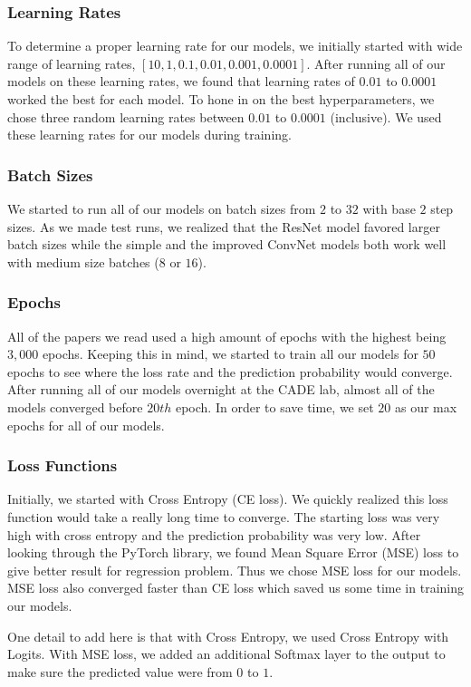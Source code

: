\documentclass[11pt]{ieeeconf}
\begin{document}
\subsubsection{Learning Rates}
To determine a proper learning rate for our models, we initially started with wide range of learning rates, $[10, 1, 0.1, 0.01, 0.001, 0.0001]$. After running all of our models on these learning rates, we found that learning rates of $0.01$ to $0.0001$ worked the best for each model. To hone in on the best hyperparameters, we chose three random learning rates between $0.01$ to $0.0001$ (inclusive). We used these learning rates for our models during training. 

\subsubsection{Batch Sizes}
We started to run all of our models on batch sizes from $2$ to $32$ with base $2$ step sizes. As we made test runs, we realized that the ResNet model favored larger batch sizes while the simple and the improved ConvNet models both work well with medium size batches ($8$ or $16$). 

\subsubsection{Epochs}
All of the papers we read used a high amount of epochs with the highest being $3,000$ epochs. Keeping this in mind, we started to train all our models for $50$ epochs to see where the loss rate and the prediction probability would converge. After running all of our models overnight at the CADE lab, almost all of the models converged before $20th$ epoch. In order to save time, we set $20$ as our max epochs for all of our models. 

\subsubsection{Loss Functions}
Initially, we started with Cross Entropy (CE loss). We quickly realized this loss function would take a really long time to converge. The starting loss was very high with cross entropy and the prediction probability was very low. After looking through the PyTorch library, we found Mean Square Error (MSE) loss to give better result for regression problem. Thus we chose MSE loss for our models. MSE loss also converged faster than CE loss which saved us some time in training our models. 

One detail to add here is that with Cross Entropy, we used Cross Entropy with Logits. With MSE loss, we added an additional Softmax layer to the output to make sure the predicted value were from $0$ to $1$. 
\end{document}
